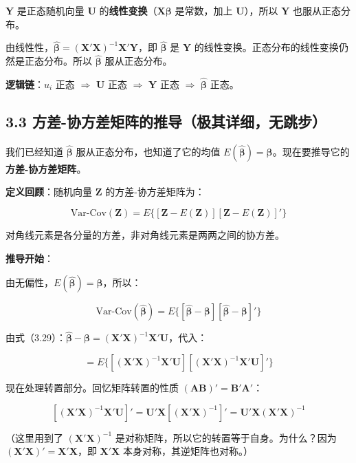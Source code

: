 \documentclass[12pt,a4paper]{ctexart}
\begin{document}
$\mathbf{Y}$ 是正态随机向量 $\mathbf{U}$ 的\textbf{线性变换}（$\mathbf{X}\boldsymbol{\beta}$ 是常数，加上 $\mathbf{U}$），所以 $\mathbf{Y}$ 也服从正态分布。

由线性性，$\hat{\boldsymbol{\beta}} = (\mathbf{X}'\mathbf{X})^{-1}\mathbf{X}'\mathbf{Y}$，即 $\hat{\boldsymbol{\beta}}$ 是 $\mathbf{Y}$ 的线性变换。正态分布的线性变换仍然是正态分布。所以 $\hat{\boldsymbol{\beta}}$ 服从正态分布。

\textbf{逻辑链}：$u_i$ 正态 $\Rightarrow$ $\mathbf{U}$ 正态 $\Rightarrow$ $\mathbf{Y}$ 正态 $\Rightarrow$ $\hat{\boldsymbol{\beta}}$ 正态。

\subsection{3.3 方差-协方差矩阵的推导（极其详细，无跳步）}

我们已经知道 $\hat{\boldsymbol{\beta}}$ 服从正态分布，也知道了它的均值 $E(\hat{\boldsymbol{\beta}}) = \boldsymbol{\beta}$。现在要推导它的\textbf{方差-协方差矩阵}。

\textbf{定义回顾}：随机向量 $\mathbf{Z}$ 的方差-协方差矩阵为：

\[
\text{Var-Cov}(\mathbf{Z}) = E\{[\mathbf{Z} - E(\mathbf{Z})][\mathbf{Z} - E(\mathbf{Z})]'\}
\]

对角线元素是各分量的方差，非对角线元素是两两之间的协方差。

\textbf{推导开始}：

由无偏性，$E(\hat{\boldsymbol{\beta}}) = \boldsymbol{\beta}$，所以：

\[
\text{Var-Cov}(\hat{\boldsymbol{\beta}}) = E\{[\hat{\boldsymbol{\beta}} - \boldsymbol{\beta}][\hat{\boldsymbol{\beta}} - \boldsymbol{\beta}]'\}
\]

由式（3.29）：$\hat{\boldsymbol{\beta}} - \boldsymbol{\beta} = (\mathbf{X}'\mathbf{X})^{-1}\mathbf{X}'\mathbf{U}$，代入：

\[
= E\{[(\mathbf{X}'\mathbf{X})^{-1}\mathbf{X}'\mathbf{U}][(\mathbf{X}'\mathbf{X})^{-1}\mathbf{X}'\mathbf{U}]'\}
\]

现在处理转置部分。回忆矩阵转置的性质 $(\mathbf{A}\mathbf{B})' = \mathbf{B}'\mathbf{A}'$：

\[
[(\mathbf{X}'\mathbf{X})^{-1}\mathbf{X}'\mathbf{U}]' = \mathbf{U}'\mathbf{X}[(\mathbf{X}'\mathbf{X})^{-1}]' = \mathbf{U}'\mathbf{X}(\mathbf{X}'\mathbf{X})^{-1}
\]

（这里用到了 $(\mathbf{X}'\mathbf{X})^{-1}$ 是对称矩阵，所以它的转置等于自身。为什么？因为 $(\mathbf{X}'\mathbf{X})' = \mathbf{X}'\mathbf{X}$，即 $\mathbf{X}'\mathbf{X}$ 本身对称，其逆矩阵也对称。）
\end{document}
